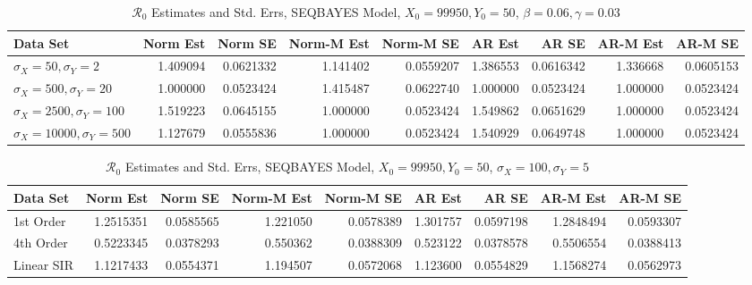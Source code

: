 \documentclass[12pt]{article}
\newcommand{\rr}{\ensuremath{\mathcal{R}_0}}
\begin{document}
\begin{table}[H]
	
	\caption{\label{tab:}$\rr$ Estimates and Std. Errs, SEQBAYES Model,
		$X_0 = 99950, Y_0 = 50$, $\beta = 0.06, \gamma = 0.03$}
	\centering
	\begin{footnotesize}
	\begin{tabular}[t]{l|r|r|r|r|r|r|r|r}
		\hline
		Data Set & Norm Est & Norm SE & Norm-M Est & Norm-M SE & AR Est & AR SE & AR-M Est & AR-M SE\\
		\hline
		$\sigma_X = 50, \sigma_Y = 2$ & 1.409094 & 0.0621332 & 1.141402 & 0.0559207 & 1.386553 & 0.0616342 & 1.336668 & 0.0605153\\
		\hline
		$\sigma_X = 500, \sigma_Y = 20$ & 1.000000 & 0.0523424 & 1.415487 & 0.0622740 & 1.000000 & 0.0523424 & 1.000000 & 0.0523424\\
		\hline
		$\sigma_X = 2500, \sigma_Y = 100$ & 1.519223 & 0.0645155 & 1.000000 & 0.0523424 & 1.549862 & 0.0651629 & 1.000000 & 0.0523424\\
		\hline
		$\sigma_X = 10000, \sigma_Y = 500$ & 1.127679 & 0.0555836 & 1.000000 & 0.0523424 & 1.540929 & 0.0649748 & 1.000000 & 0.0523424\\
		\hline
	\end{tabular}
\end{footnotesize}
\end{table}

\begin{table}[H]
	
	\caption{\label{tab:}$\rr$ Estimates and Std. Errs, SEQBAYES Model,
		$X_0 = 99950, Y_0 = 50$, $\sigma_X = 100, \sigma_Y = 5$}
	\centering
	\begin{footnotesize}
	\begin{tabular}[t]{l|r|r|r|r|r|r|r|r}
		\hline
		Data Set & Norm Est & Norm SE & Norm-M Est & Norm-M SE & AR Est & AR SE & AR-M Est & AR-M SE\\
		\hline
		1st Order & 1.2515351 & 0.0585565 & 1.221050 & 0.0578389 & 1.301757 & 0.0597198 & 1.2848494 & 0.0593307\\
		\hline
		4th Order & 0.5223345 & 0.0378293 & 0.550362 & 0.0388309 & 0.523122 & 0.0378578 & 0.5506554 & 0.0388413\\
		\hline
		Linear SIR & 1.1217433 & 0.0554371 & 1.194507 & 0.0572068 & 1.123600 & 0.0554829 & 1.1568274 & 0.0562973\\
		\hline
	\end{tabular}
	\end{footnotesize}
\end{table}
\end{document}
